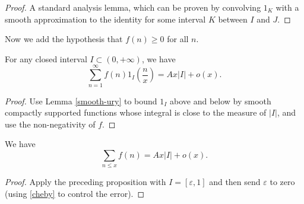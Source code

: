 \begin{proof}  A standard analysis lemma, which can be proven by convolving $1_K$ with a smooth approximation to the identity for some interval $K$ between $I$ and $J$.
\end{proof}

Now we add the hypothesis that $f(n) \geq 0$ for all $n$.

\begin{proposition}
\label{WienerIkeharaInterval}
  For any closed interval $I \subset (0,+\infty)$, we have
  $$ \sum_{n=1}^\infty f(n) 1_I( \frac{n}{x} ) = A x |I|  + o(x).$$
\end{proposition}

\begin{proof}
  Use Lemma \ref{smooth-ury} to bound $1_I$ above and below by smooth compactly supported functions whose integral is close to the measure of $|I|$, and use the non-negativity of $f$.
\end{proof}

\begin{corollary}\label{WienerIkehara}
  We have
$$ \sum_{n\leq x} f(n) = A x |I|  + o(x).$$
\end{corollary}



\begin{proof}
  Apply the preceding proposition with $I = [\varepsilon,1]$ and then send $\varepsilon$ to zero (using \eqref{cheby} to control the error).
\end{proof}


